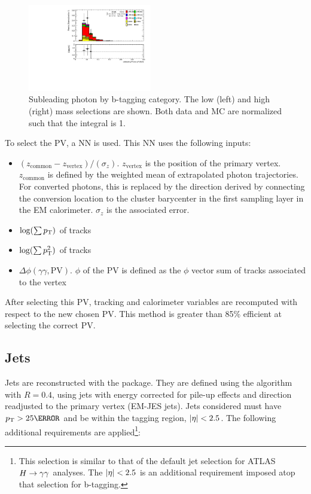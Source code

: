 \begin{figure}[htbp]
  \includegraphics[width=0.48\textwidth]{chapters/chapter5_yybb/images/data_MC_comparison/h_SR_h_2t_nominal_subleadingPhoton_pt.pdf}
  \caption[Subleading photon \pt.]{Subleading photon \pt by b-tagging category. The low (left) and high (right) mass selections are shown. Both data and MC are normalized such that the integral is 1.
  \label{fig:photon_s_pt}}
\end{figure}

To select the \gls{PV}, a \gls{NN} is used. This \gls{NN} uses the following inputs:
\begin{itemize}
  \item $(z_{\text{common}} - z_{\text{vertex}})/(\sigma_z)$. $z_{\text{vertex}}$ is the position of the primary vertex. $z_{\text{common}}$ is defined by the weighted mean of extrapolated photon trajectories. For converted photons, this is replaced by the direction derived by connecting the conversion location to the cluster barycenter in the first sampling layer in the \gls{EM} calorimeter. $\sigma_z$ is the associated error.
  \item $\log(\sum p_{\text{T}})$ of tracks
  \item $\log(\sum p_{\text{T}}^2)$ of tracks
  \item $\Delta \phi(\gamma\gamma,\text{PV})$. $\phi$ of the \gls{PV} is defined as the $\phi$ vector sum of tracks associated to the vertex
  
\end{itemize}
After selecting this \gls{PV}, tracking and calorimeter variables are recomputed with respect to the new chosen \gls{PV}. This method is greater than 85\% efficient at selecting the correct \gls{PV}.


\subsection{Jets}

Jets are reconstructed with the  \cite{fastjet} package. They are defined using the \antikt algorithm with $R=0.4$, using jets with energy corrected for pile-up effects and direction readjusted to the primary vertex (EM-JES jets). Jets considered must have $\pt > \unit{25}{\GeV}$ and be within the tagging region, $|\eta| < 2.5$. The following additional requirements are applied\footnote{This selection is similar to that of the default jet selection for ATLAS $H\rightarrow \gamma\gamma$ analyses. The $|\eta| < 2.5$ is an additional requirement imposed atop that selection for b-tagging.}:

